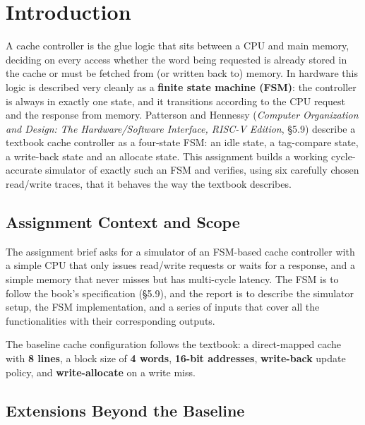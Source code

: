 \documentclass[11pt,a4paper]{article}
\begin{document}
\tableofcontents
\newpage

\section{Introduction}

A cache controller is the glue logic that sits between a CPU and main memory,
deciding on every access whether the word being requested is already stored in
the cache or must be fetched from (or written back to) memory. In hardware this
logic is described very cleanly as a \textbf{finite state machine (FSM)}: the
controller is always in exactly one state, and it transitions according to the
CPU request and the response from memory. Patterson and Hennessy
(\textit{Computer Organization and Design: The Hardware/Software Interface,
RISC-V Edition}, \S5.9) describe a textbook cache controller as a four-state
FSM: an idle state, a tag-compare state, a write-back state and an allocate
state. This assignment builds a working cycle-accurate simulator of exactly
such an FSM and verifies, using six carefully chosen read/write traces, that
it behaves the way the textbook describes.

\subsection{Assignment Context and Scope}

The assignment brief asks for a simulator of an FSM-based cache controller
with a simple CPU that only issues read/write requests or waits for a response,
and a simple memory that never misses but has multi-cycle latency. The FSM is
to follow the book's specification (\S5.9), and the report is to describe the
simulator setup, the FSM implementation, and a series of inputs that cover all
the functionalities with their corresponding outputs.

The baseline cache configuration follows the textbook: a direct-mapped cache
with \textbf{8 lines}, a block size of \textbf{4 words}, \textbf{16-bit
addresses}, \textbf{write-back} update policy, and \textbf{write-allocate} on
a write miss.

\subsection{Extensions Beyond the Baseline}
\end{document}
